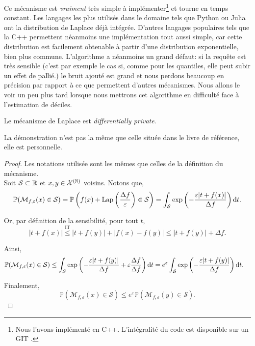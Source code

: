 Ce mécanisme est \textit{vraiment} très simple à implémenter\footnote{Nous l'avons implémenté en C++. L'intégralité du code est disponible sur un GIT \cite{git}. } et tourne en temps constant. Les langages les plus utilisés dans le domaine tels que Python ou Julia ont la distribution de {\sc Laplace} déjà intégrée. D'autres langages populaires tels que la C++ permettent néanmoins une implémentation tout aussi simple, car cette distribution est facilement obtenable à partir d'une distribution exponentielle, bien plus commune. L'algorithme a néanmoins un grand défaut: si la requête est très sensible (c'est par exemple le cas si, comme pour les quantiles, elle peut subir un effet de pallié.) le bruit ajouté est grand et nous perdons beaucoup en précision par rapport à ce que permettent d'autres mécanismes. Nous allons le voir un peu plus tard lorsque nous mettrons cet algorithme en difficulté face à l'estimation de déciles.\\
 
\begin{theorem}
    Le mécanisme de {\sc Laplace} est \textit{differentially private}.
\end{theorem}


\begin{remark}
    La démonstration n'est pas la même que celle située dans le livre de référence, elle est personnelle.
\end{remark}

\begin{proof}
    Les notations utilisée sont les mêmes que celles de la définition du mécanisme.\\
    Soit \(\mathcal S \subset \mathbb{R}\) et \(x,y \in \mathcal X^{(\mathbb{N})}\) voisins. Notons que,
    \begin{align*}
        \mathbb P(\mathcal M_{f,\varepsilon}(x) \in \mathcal S) = \mathbb P\left( f(x) + \text{Lap}\left( \dfrac{\Delta f}{\varepsilon} \right) \in \mathcal S\right) = \int_\mathcal S \exp\left( -\dfrac{\varepsilon |t + f(x)|}{\Delta f} \right) \mathrm{d} t.
    \end{align*}

    Or, par définition de la sensibilité, pour tout \(t\),
    \[
        |t + f(x)| \overset{\text{IT}}{\leq} |t + f(y)| + |f(x) - f(y)| \leq |t + f(y)| + \Delta f.
    \]

    Ainsi,
    \begin{align*}
        \mathbb P(\mathcal M_{f,\varepsilon}(x) \in \mathcal S) & \leq \int_\mathcal S \exp\left( -\dfrac{\varepsilon |t + f(y)|}{\Delta f} + \varepsilon \dfrac{\Delta f}{\Delta f}   \right) \mathrm{d} t = e^\varepsilon\int_\mathcal S \exp\left( -\dfrac{\varepsilon |t + f(y)|}{\Delta f} \right) \mathrm{d} t.
    \end{align*}

    Finalement,
    \[ \mathbb P(\mathcal M_{f,\varepsilon}(x) \in \mathcal S) \leq e^{\varepsilon} \mathbb P(\mathcal M_{f,\varepsilon}(y) \in \mathcal S).\]
\end{proof}


